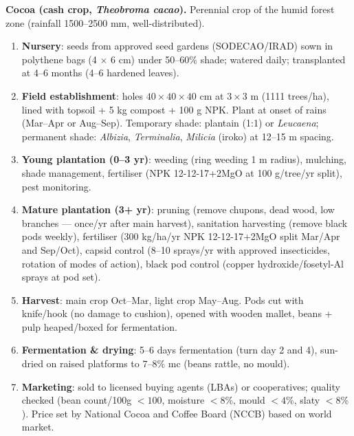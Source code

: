 \documentclass[11pt]{article}
\begin{document}
\textbf{Cocoa (cash crop, \emph{Theobroma cacao}).} Perennial crop of the humid forest zone (rainfall 1500--2500 mm, well-distributed).
\begin{enumerate}
\item \textbf{Nursery}: seeds from approved seed gardens (SODECAO/IRAD) sown in polythene bags (4 $\times$ 6 cm) under 50--60\% shade; watered daily; transplanted at 4--6 months (4--6 hardened leaves).
\item \textbf{Field establishment}: holes $40 \times 40 \times 40$ cm at $3 \times 3$ m (1111 trees/ha), lined with topsoil + 5 kg compost + 100 g NPK. Plant at onset of rains (Mar--Apr or Aug--Sep). Temporary shade: plantain (1:1) or \emph{Leucaena}; permanent shade: \emph{Albizia}, \emph{Terminalia}, \emph{Milicia} (iroko) at 12--15 m spacing.
\item \textbf{Young plantation (0--3 yr)}: weeding (ring weeding 1 m radius), mulching, shade management, fertiliser (NPK 12-12-17+2MgO at 100 g/tree/yr split), pest monitoring.
\item \textbf{Mature plantation (3+ yr)}: pruning (remove chupons, dead wood, low branches — once/yr after main harvest), sanitation harvesting (remove black pods weekly), fertiliser (300 kg/ha/yr NPK 12-12-17+2MgO split Mar/Apr and Sep/Oct), capsid control (8--10 sprays/yr with approved insecticides, rotation of modes of action), black pod control (copper hydroxide/fosetyl-Al sprays at pod set).
\item \textbf{Harvest}: main crop Oct--Mar, light crop May--Aug. Pods cut with knife/hook (no damage to cushion), opened with wooden mallet, beans + pulp heaped/boxed for fermentation.
\item \textbf{Fermentation \& drying}: 5--6 days fermentation (turn day 2 and 4), sun-dried on raised platforms to $7$--$8\%$ mc (beans rattle, no mould).
\item \textbf{Marketing}: sold to licensed buying agents (LBAs) or cooperatives; quality checked (bean count/100g $<100$, moisture $<8\%$, mould $<4\%$, slaty $<8\%$). Price set by National Cocoa and Coffee Board (NCCB) based on world market.
\end{enumerate}
\end{document}

